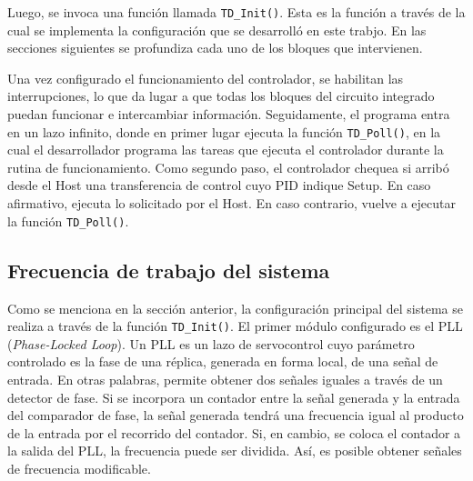 	Luego, se invoca una función llamada \verb|TD_Init()|. Esta es la función a través de la cual se implementa la configuración que se desarrolló en este trabjo. En las secciones siguientes se profundiza cada uno de los bloques que intervienen.
	
	Una vez configurado el funcionamiento del controlador, se habilitan las interrupciones, lo que da lugar a que todas los bloques del circuito integrado puedan funcionar e intercambiar información. Seguidamente, el programa entra en un lazo infinito, donde en primer lugar ejecuta la función \verb|TD_Poll()|, en la cual el desarrollador programa las tareas que ejecuta el controlador durante la rutina de funcionamiento. Como segundo paso, el controlador chequea si arribó desde el Host una transferencia de control cuyo PID indique Setup. En caso afirmativo, ejecuta lo solicitado por el Host. En caso contrario, vuelve a ejecutar la función \verb|TD_Poll()|.
	
\subsection{Frecuencia de trabajo del sistema}
	Como se menciona en la sección anterior, la configuración principal del sistema se realiza a través de la función \verb|TD_Init()|. El primer módulo configurado es el PLL ({\it Phase-Locked Loop}). Un PLL es un lazo de servocontrol cuyo parámetro controlado es la fase de una réplica, generada en forma local, de una señal de entrada\cite{Sklar2001}. En otras palabras, permite obtener dos señales iguales a través de un detector de fase. Si se incorpora un contador entre la señal generada y la entrada del comparador de fase, la señal generada tendrá una frecuencia igual al producto de la entrada por el recorrido del contador. Si, en cambio, se coloca el contador a la salida del PLL, la frecuencia puede ser dividida. Así, es posible obtener señales de frecuencia modificable.

